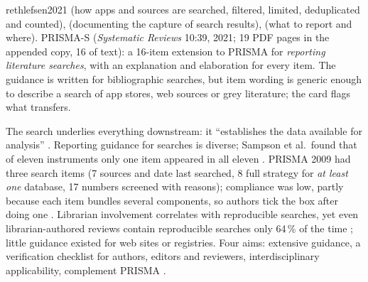 \begin{papercard}{rethlefsen2021}
  (how apps and sources are searched, filtered, limited, deduplicated and counted),  (documenting the capture of search results),  (what to report and where). PRISMA-S (\emph{Systematic Reviews} 10:39, 2021; 19 PDF pages in the appended copy, 16 of text): a 16-item extension to PRISMA for \emph{reporting literature searches}, with an explanation and elaboration for every item. The guidance is written for bibliographic searches, but item wording is generic enough to describe a search of app stores, web sources or grey literature; the card flags what transfers.

 The search underlies everything downstream: it ``establishes the data available for analysis'' . Reporting guidance for searches is diverse; Sampson et al.\ found that of eleven instruments only one item appeared in all eleven . PRISMA 2009 had three search items (7 sources and date last searched, 8 full strategy for \emph{at least one} database, 17 numbers screened with reasons); compliance was low, partly because each item bundles several components, so authors tick the box after doing one . Librarian involvement correlates with reproducible searches, yet even librarian-authored reviews contain reproducible searches only 64\,\% of the time ; little guidance existed for web sites or registries. Four aims: extensive guidance, a verification checklist for authors, editors and reviewers, interdisciplinary applicability, complement PRISMA .


\end{papercard}
